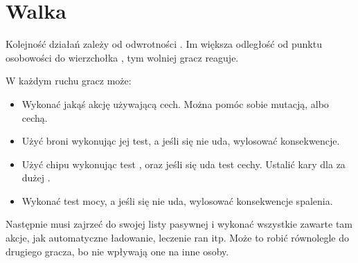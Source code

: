 \chapter{Walka}
Kolejność działań zależy od odwrotności \abp.
Im większa odległość od punktu osobowości do wierzchołka \abp, tym wolniej gracz reaguje.

W każdym ruchu gracz może:
\begin{itemize}
\item Wykonać jakąś akcję używającą cech. Można pomóc sobie mutacją, albo cechą.
\item Użyć broni wykonując jej test, a jeśli się nie uda, wylosować konsekwencje.
\item Użyć chipu wykonując test \abnkp, oraz jeśli się uda test cechy. Ustalić kary dla za dużej \abnkp.
\item Wykonać test mocy, a jeśli się nie uda, wylosować konsekwencje spalenia.
\end{itemize}

Następnie musi zajrzeć do swojej listy pasywnej i wykonać wszystkie zawarte tam akcje, jak automatyczne ładowanie, leczenie ran itp.
Może to robić równolegle do drugiego gracza, bo nie wpływają one na inne osoby.



